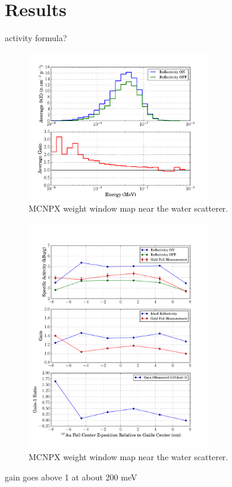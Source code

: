 \documentclass[a4paper,
              ]{jacow}
\begin{document}
\section{Results}

activity formula?

\begin{figure}[!htb]
   \centering
   \includegraphics*[trim = 10mm 0mm 15mm 0mm, width=80mm]{graphics/gain.pdf}
   \caption{MCNPX weight window map near the water scatterer.}
   \label{gain}
\end{figure}

\begin{figure}[!htb]
   \centering
   \includegraphics*[trim = 0mm 0mm 15mm 0mm, width=80mm]{graphics/GF_act.pdf}
   \caption{MCNPX weight window map near the water scatterer.}
   \label{activation}
\end{figure}

gain goes above 1 at about 200 meV
\end{document}
